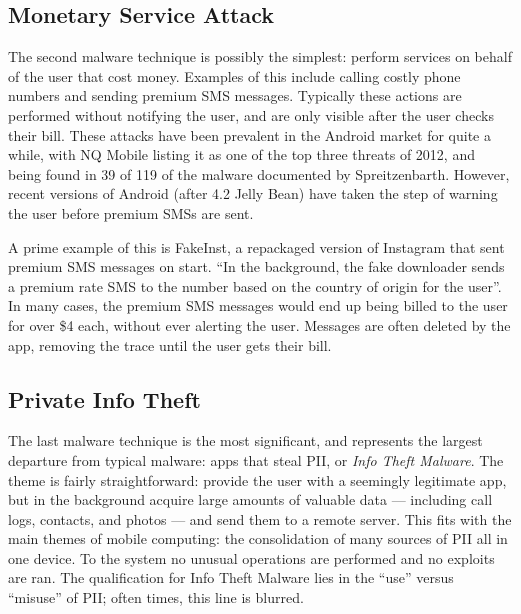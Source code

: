 \documentclass{acm_proc_article-sp}
\begin{document}
\subsection{Monetary Service Attack}
\label{sec:premiumsms}
The second malware technique is possibly the simplest: perform services on behalf of the user that cost money. Examples of this include calling costly phone numbers and sending premium SMS messages. Typically these actions are performed without notifying the user, and are only visible after the user checks their bill. These attacks have been prevalent in the Android market for quite a while, with NQ Mobile\citep{nq2013} listing it as one of the top three threats of 2012, and being found in 39 of 119 of the malware documented by Spreitzenbarth\citep{spreitzenbarth2013}. However, recent versions of Android (after 4.2 Jelly Bean\citep{androidjbsecurity}) have taken the step of warning the user before premium SMSs are sent. %

A prime example of this is FakeInst\citep{avastfakeinst}, a repackaged version of Instagram\citep{instagramandroid} that sent premium SMS messages on start. ``In the background, the fake downloader sends a premium rate SMS to the number based on the country of origin for the user''\citep{avastfakeinst}. In many cases, the premium SMS messages would end up being billed to the user for over \$4 each\citep{avastfakeinst}, without ever alerting the user. Messages are often deleted by the app, removing the trace until the user gets their bill.

\subsection{Private Info Theft}
The last malware technique is the most significant, and represents the largest departure from typical malware: apps that steal PII, or \textit{Info Theft Malware}. The theme is fairly straightforward: provide the user with a seemingly legitimate app, but in the background acquire large amounts of valuable data --- including call logs, contacts, and photos --- and send them to a remote server. This fits with the main themes of mobile computing: the consolidation of many sources of PII all in one device. 
To the system no unusual operations are performed and no exploits are ran. The qualification for Info Theft Malware lies in the ``use'' versus ``misuse'' of PII; often times, this line is blurred.
\end{document}
